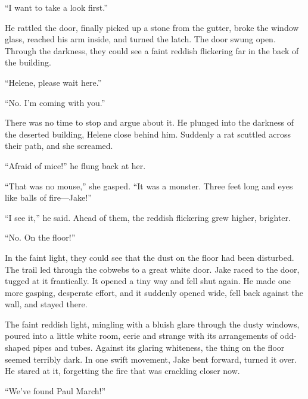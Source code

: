 \documentclass{novel}
\begin{document}
“I want to take a look first.”

He rattled the door, finally picked up a stone from the gutter, broke the window glass, reached his arm inside, and turned the latch. The door swung open. Through the darkness, they could see a faint reddish flickering far in the back of the building.

“Helene, please wait here.”

“No. I’m coming with you.”

There was no time to stop and argue about it. He plunged into the darkness of the deserted building, Helene close behind him. Suddenly a rat scuttled across their path, and she screamed.

“Afraid of mice!” he flung back at her.

“That was no mouse,” she gasped. “It was a monster. Three feet long and eyes like balls of fire—Jake!”

“I see it,” he said. Ahead of them, the reddish flickering grew higher, brighter.

“No. On the floor!”

In the faint light, they could see that the dust on the floor had been disturbed. The trail led through the cobwebs to a great white door. Jake raced to the door, tugged at it frantically. It opened a tiny way and fell shut again. He made one more gasping, desperate effort, and it suddenly opened wide, fell back against the wall, and stayed there.

The faint reddish light, mingling with a bluish glare through the dusty windows, poured into a little white room, eerie and strange with its arrangements of odd-shaped pipes and tubes. Against its glaring whiteness, the thing on the floor seemed terribly dark. In one swift movement, Jake bent forward, turned it over. He stared at it, forgetting the fire that was crackling closer now.

“We’ve found Paul March!”

\begin{ChapterStart}
\vspace{3\nbs}
\end{ChapterStart}
\end{document}
